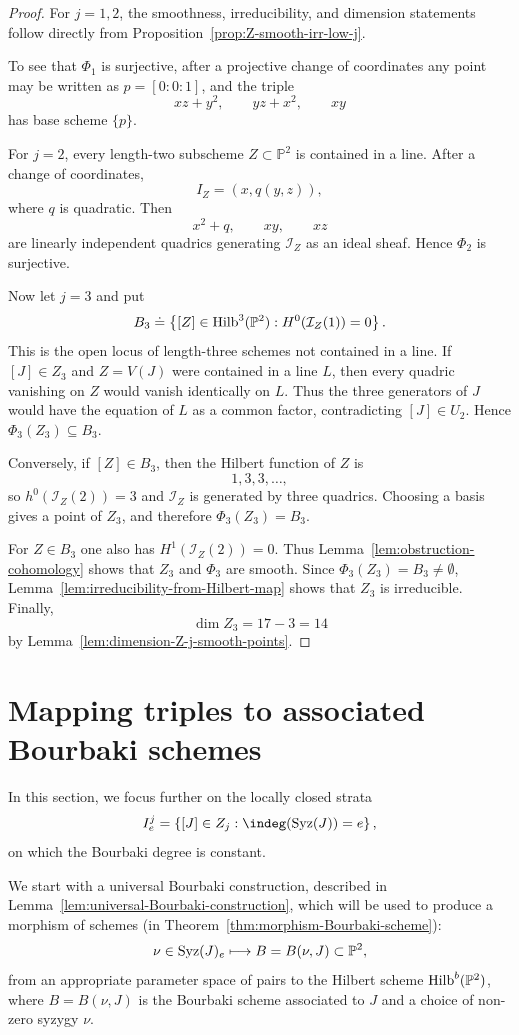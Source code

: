 \documentclass[11pt]{amsart} %
\theoremstyle{definition}
\def\syz{\mbox{\rm Syz}}
\def\NZQ{\mathbb}               %
\def\PP{{\NZQ P}}
\def\Hilbert{{\rm Hilb}}
\begin{document}
\begin{proof}
For $j=1,2$, the smoothness, irreducibility, and dimension statements
follow directly from Proposition~\ref{prop:Z-smooth-irr-low-j}.

To see that $\Phi_1$ is surjective, after a projective change of
coordinates any point may be written as $p=[0:0:1]$, and the triple
\[
xz+y^2,\qquad yz+x^2,\qquad xy
\]
has base scheme $\{p\}$.

For $j=2$, every length-two subscheme $Z\subset\PP^2$ is contained
in a line. After a change of coordinates,
\[
I_Z=(x,q(y,z)),
\]
where $q$ is quadratic. Then
\[
x^2+q,\qquad xy,\qquad xz
\]
are linearly independent quadrics generating $\mathcal I_Z$ as an
ideal sheaf. Hence $\Phi_2$ is surjective.

Now let $j=3$ and put
\[
B_3
\doteq
\left\{
[Z]\in\Hilbert^3(\PP^2):
H^0(\mathcal I_Z(1))=0
\right\}.
\]
This is the open locus of length-three schemes not contained in a
line. If $[J]\in Z_3$ and $Z=V(J)$ were contained in a line $L$,
then every quadric vanishing on $Z$ would vanish identically on $L$.
Thus the three generators of $J$ would have the equation of $L$ as a
common factor, contradicting $[J]\in U_2$. Hence \(\Phi_3(Z_3)\subseteq B_3\).

Conversely, if $[Z]\in B_3$, then the Hilbert function of $Z$ is
\[
1,3,3,\ldots,
\]
so \(h^0(\mathcal I_Z(2))=3\) and $\mathcal I_Z$ is generated by three quadrics. Choosing a basis
gives a point of $Z_3$, and therefore \(
\Phi_3(Z_3)=B_3\).

For $Z\in B_3$ one also has \(H^1(\mathcal I_Z(2))=0\). Thus Lemma~\ref{lem:obstruction-cohomology} shows that $Z_3$ and
$\Phi_3$ are smooth. Since
\(
\Phi_3(Z_3)=B_3\neq\emptyset\), Lemma~\ref{lem:irreducibility-from-Hilbert-map} shows that $Z_3$ is
irreducible. Finally,
\[
\dim Z_3=17-3=14
\]
by Lemma~\ref{lem:dimension-Z-j-smooth-points}.
\end{proof}

\section{Mapping triples to associated Bourbaki schemes}\label{sec:Bourbaki-map}

In this section, we focus further on the locally closed strata
\[
I_e^j
=
\left\{
[J]\in Z_j:
\indeg(\syz(J))=e
\right\},
\]
on which the Bourbaki degree is constant.

We start with a universal Bourbaki construction, described in Lemma~\ref{lem:universal-Bourbaki-construction}, which will be used to produce a morphism of schemes (in Theorem~\ref{thm:morphism-Bourbaki-scheme}):
$$
\nu \in \syz(J)_e \longmapsto B = B(\nu, J) \subset \mathbb{P}^2,
$$
from an appropriate parameter space of pairs to the Hilbert scheme $\Hilbert^b(\mathbb{P}^2)$, where $B = B(\nu, J)$ is the Bourbaki scheme associated to $J$ and a choice of non-zero syzygy $\nu$. 
\end{document}
